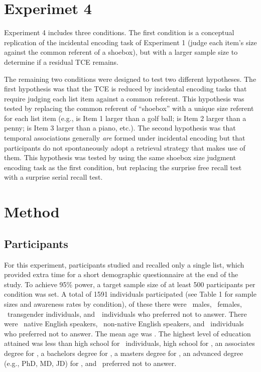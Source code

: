 \documentclass[man,natbib,floatsintext]{apa6} %
\begin{document}
\section{Experimet 4}
Experiment 4 includes three conditions. The first condition is a conceptual replication of the incidental encoding task of Experiment 1 (judge each item's size against the common referent of a shoebox), but with a larger sample size to determine if a residual TCE remains. 

The remaining two conditions were designed to test two different hypotheses.
The first hypothesis was that the TCE is reduced by incidental encoding tasks that require judging each list item against a common referent. This hypothesis was tested by replacing the common referent of ``shoebox'' with a unique size referent for each list item (e.g., is Item 1 larger than a golf ball; is Item 2 larger than a penny; is Item 3 larger than a piano, etc.). The second hypothesis was that temporal associations generally \emph{are} formed under incidental encoding but that participants do not spontaneously adopt a retrieval strategy that makes use of them. This hypothesis was tested by using the same shoebox size judgment encoding task as the first condition, but replacing the surprise free recall test with a surprise serial recall test.

\section{Method}
\subsection{Participants}
For this experiment, participants studied and recalled only a single list, which provided extra time for a short demographic questionnaire at the end of the study. To achieve 95\% power, a target sample size of at least 500 participants per condition was set. A total of 1591 individuals participated (see Table 1 for sample sizes and awareness rates by condition), of these there were \males~males, \females~females, \others~transgender individuals, and~\notans~individuals who preferred not to answer. There were \engY~native English speakers, \engN~non-native English speakers, and \engS~individuals who preferred not to answer.  The mean age was \age. The highest level of education attained was less than high school for \noed~individuals, high school for \hschool, an associates degree for \ass, a bachelors degree for \bac, a masters degree for \mas, an advanced degree (e.g., PhD, MD, JD) for \phd, and \notansed~preferred not to answer.
\end{document}
